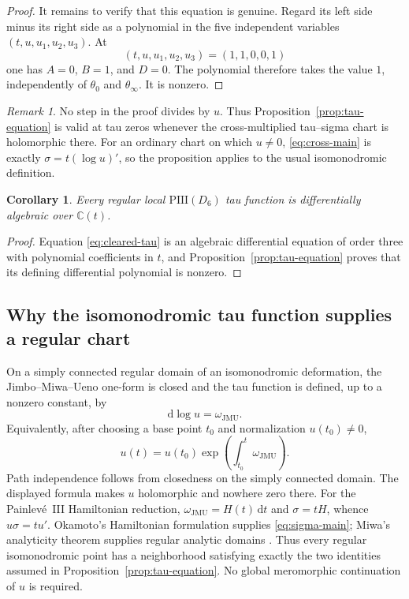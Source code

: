 \documentclass[11pt]{article}
\numberwithin{equation}{section}
\newtheorem{corollary}[theorem]{Corollary}
\theoremstyle{definition}
\theoremstyle{remark}
\newtheorem{remark}[theorem]{Remark}
\newcommand{\C}{\mathbb C}
\newcommand{\dd}{\mathrm d}
\begin{document}
\begin{proof}
It remains to verify that this equation is genuine.  Regard its left side minus its right side as
a polynomial in the five independent variables $(t,u,u_1,u_2,u_3)$.  At
\[
 (t,u,u_1,u_2,u_3)=(1,1,0,0,1)
\]
one has $A=0$, $B=1$, and $D=0$.  The polynomial therefore takes the value $1$, independently of
$\theta_0$ and $\theta_\infty$.  It is nonzero.
\end{proof}

\begin{remark}
No step in the proof divides by $u$.  Thus Proposition~\ref{prop:tau-equation} is valid at tau
zeros whenever the cross-multiplied tau--sigma chart is holomorphic there.  For an ordinary chart
on which $u\neq0$, \eqref{eq:cross-main} is exactly
$\sigma=t(\log u)'$, so the proposition applies to the usual isomonodromic definition.
\end{remark}

\begin{corollary}
\label{cor:tau-da}
Every regular local $\mathrm{PIII}(D_6)$ tau function is differentially algebraic over $\C(t)$.
\end{corollary}

\begin{proof}
Equation \eqref{eq:cleared-tau} is an algebraic differential equation of order three with
polynomial coefficients in $t$, and Proposition~\ref{prop:tau-equation} proves that its defining
differential polynomial is nonzero.
\end{proof}

\subsection{Why the isomonodromic tau function supplies a regular chart}
\label{subsec:tau-chart}

On a simply connected regular domain of an isomonodromic deformation, the Jimbo--Miwa--Ueno
one-form is closed and the tau function is defined, up to a nonzero constant, by
\[
 \dd\log u=\omega_{\mathrm{JMU}}.
\]
Equivalently, after choosing a base point $t_0$ and normalization $u(t_0)\neq0$,
\[
 u(t)=u(t_0)\exp\left(\int_{t_0}^{t}\omega_{\mathrm{JMU}}\right).
\]
Path independence follows from closedness on the simply connected domain.  The displayed formula
makes $u$ holomorphic and nowhere zero there.  For the Painlev\'e~III Hamiltonian reduction,
$\omega_{\mathrm{JMU}}=H(t)\,\dd t$ and $\sigma=tH$, whence
$u\sigma=tu'$.  Okamoto's Hamiltonian formulation supplies
\eqref{eq:sigma-main}; Miwa's analyticity theorem supplies regular analytic domains
\cite{JMU1981,Miwa1981,Okamoto1981,Okamoto1987}.  Thus every regular isomonodromic point has a
neighborhood satisfying exactly the two identities assumed in
Proposition~\ref{prop:tau-equation}.  No global meromorphic continuation of $u$ is required.
\end{document}
